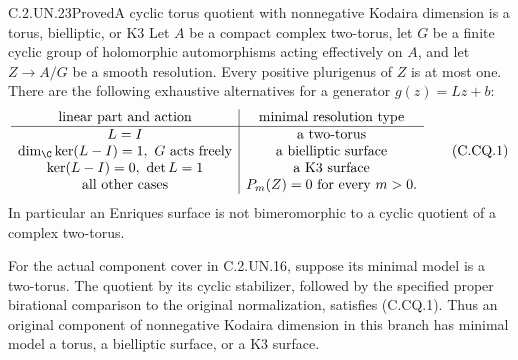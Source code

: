 \begin{statement}{C.2.UN.23}{Proved}{A cyclic torus quotient with nonnegative Kodaira dimension is a torus, bielliptic, or K3}
Let $A$ be a compact complex two-torus, let $G$ be a finite
cyclic group of holomorphic automorphisms acting effectively
on $A$, and let $Z\to A/G$ be a smooth resolution.
Every positive plurigenus of $Z$ is at most one. There are
the following exhaustive alternatives for a generator
$g(z)=Lz+b$:
\[
\begin{array}{c|c}
\text{linear part and action}&\text{minimal resolution type}\\ \hline
L=I&\text{a two-torus}\\
\dim_{\C}\ker(L-I)=1,\ G\text{ acts freely}
   &\text{a bielliptic surface}\\
\ker(L-I)=0,\ \det L=1&\text{a K3 surface}\\
\text{all other cases}&P_m(Z)=0\text{ for every }m>0 .
\end{array}                                                    \tag{C.CQ.1}
\]
In particular an Enriques surface is not bimeromorphic to
a cyclic quotient of a complex two-torus.

For the actual component cover in C.2.UN.16, suppose its
minimal model is a two-torus. The quotient by its cyclic
stabilizer, followed by the specified proper birational
comparison to the original normalization, satisfies
(C.CQ.1). Thus an original component of nonnegative
Kodaira dimension in this branch has minimal model a
torus, a bielliptic surface, or a K3 surface.
\end{statement}
